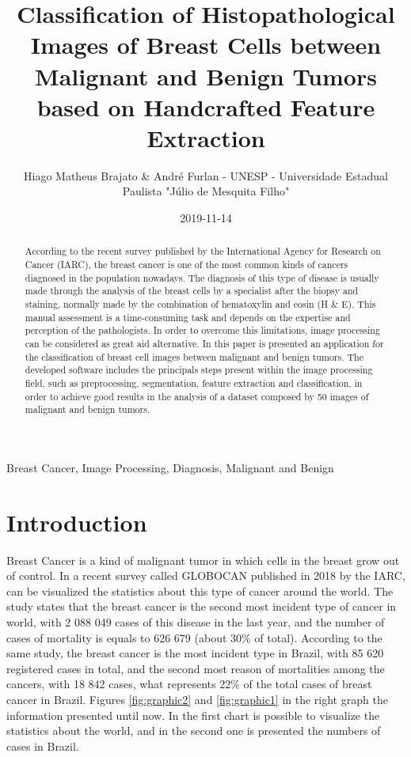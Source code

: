 \documentclass[conference]{IEEEtran}
\begin{document}
	\title{Classification of Histopathological Images of Breast Cells between Malignant and Benign Tumors based on Handcrafted Feature Extraction}
	\author{Hiago Matheus Brajato \& André Furlan - UNESP - Universidade Estadual Paulista "Júlio de Mesquita Filho"}
	\date{2019-11-14}
	\maketitle

	\begin{abstract}
		According to the recent survey published by the International Agency for Research on Cancer (IARC), the breast cancer is one of the most common kinds of cancers diagnosed in the population nowadays. The diagnosis of this type of disease is usually made through the analysis of the breast cells by a specialist after the biopsy and staining, normally made by the combination of hematoxylin and eosin (H \& E). This manual assessment is a time-consuming task and depends on the expertise and perception of the pathologists. In order to overcome this limitations, image processing can be considered as great aid alternative. In this paper is presented an application for the classification of breast cell images between malignant and benign tumors. The developed software includes the principals steps present within the image processing field, such as preprocessing, segmentation, feature extraction and classification, in order to achieve good results in the analysis of a dataset composed by 50 images of malignant and benign tumors.
	\end{abstract}
	
	\begin{IEEEkeywords}
		Breast Cancer, Image Processing, Diagnosis, Malignant and Benign
	\end{IEEEkeywords}

	\section{Introduction}	
		\par Breast Cancer is a kind of malignant tumor in which cells in the breast grow out of control. In a recent survey called GLOBOCAN \cite{GLOBOCAN} published in 2018 by the IARC, can be visualized the statistics about this type of cancer around the world. The study states that the breast cancer is the second most incident type of cancer in world, with 2 088 049 cases of this disease in the last year, and the number of cases of mortality is equals to 626 679 (about 30\% of total). According to the same study, the breast cancer is the most incident type in Brazil, with 85 620 registered cases in total, and the second most reason of mortalities among the cancers, with 18 842 cases, what represents 22\% of the total cases of breast cancer in Brazil. Figures \ref{fig:graphic2} and \ref{fig:graphic1} in the right graph the information presented until now. In the first chart is possible to visualize the statistics about the world, and in the second one is presented the numbers of cases in Brazil.
		
\end{document}
